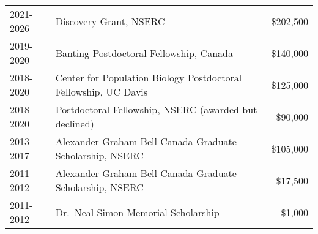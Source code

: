 \documentclass[12pt]{article}
\begin{document}
\begin{tabular}{llr}
  2021-2026 & Discovery Grant, NSERC & \$202,500 \\
  2019-2020 & Banting Postdoctoral Fellowship, Canada & \$140,000 \\
  2018-2020 & Center for Population Biology Postdoctoral Fellowship, UC Davis & \$125,000 \\
  2018-2020 & Postdoctoral Fellowship, NSERC (awarded but declined) & \$90,000 \\
  2013-2017 & Alexander Graham Bell Canada Graduate Scholarship, NSERC & \$105,000\\
  2011-2012 & Alexander Graham Bell Canada Graduate Scholarship, NSERC & \$17,500\\
  2011-2012 & Dr.\ Neal Simon Memorial Scholarship & \$1,000\\

\end{tabular}
\end{document}
